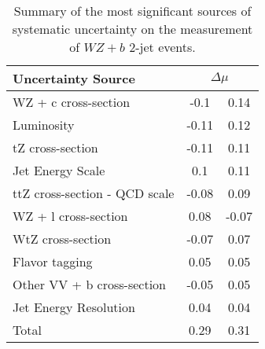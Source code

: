 \begin{table}[H]
    \centering
    \begin{tabular}{l|cc}
        \hline\hline
        Uncertainty Source & \multicolumn{2}{c}{$\Delta \mu$ }  \\
        \hline
        WZ + c cross-section & -0.1 & 0.14 \\
        Luminosity & -0.11 & 0.12 \\
        tZ cross-section & -0.11 & 0.11 \\
        Jet Energy Scale & 0.1 & 0.11 \\
        ttZ cross-section - QCD scale & -0.08 & 0.09 \\
        WZ + l cross-section & 0.08 & -0.07 \\
        WtZ cross-section & -0.07 & 0.07 \\
        Flavor tagging  & 0.05 & 0.05 \\
        Other VV + b cross-section & -0.05 & 0.05 \\
        Jet Energy Resolution & 0.04 & 0.04 \\
        \hline
        Total & 0.29 & 0.31 \\

        \hline\hline
    \end{tabular}
    \caption{Summary of the most significant sources of systematic uncertainty on the measurement of $WZ+b$ 2-jet events.}
    \label{tab:systematics_2j}
\end{table}

